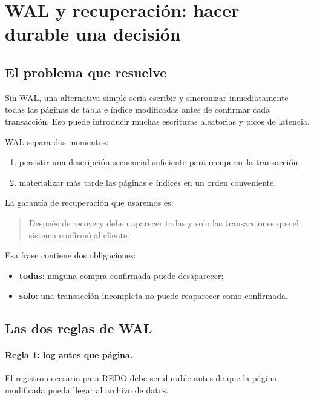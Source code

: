 \documentclass[variant=apuntes,cover=institutional,mode=screen]{ua-engineering-v6-article}
\begin{document}
\section{WAL y recuperación: hacer durable una decisión}

\subsection{El problema que resuelve}

Sin WAL, una alternativa simple sería escribir y sincronizar inmediatamente todas las páginas de tabla e índice modificadas antes de confirmar cada transacción. Eso puede introducir muchas escrituras aleatorias y picos de latencia.

WAL separa dos momentos:

\begin{enumerate}
\item persistir una descripción secuencial suficiente para recuperar la transacción;
\item materializar más tarde las páginas e índices en un orden conveniente.
\end{enumerate}

La garantía de recuperación que usaremos es:

\begin{quote}
Después de recovery deben aparecer todas y solo las transacciones que el sistema confirmó al cliente.
\end{quote}

Esa frase contiene dos obligaciones:

\begin{itemize}
\item \textbf{todas}: ninguna compra confirmada puede desaparecer;
\item \textbf{solo}: una transacción incompleta no puede reaparecer como confirmada.
\end{itemize}

\subsection{Las dos reglas de WAL}

\paragraph{Regla 1: log antes que página.} El registro necesario para REDO debe ser durable antes de que la página modificada pueda llegar al archivo de datos.
\end{document}
